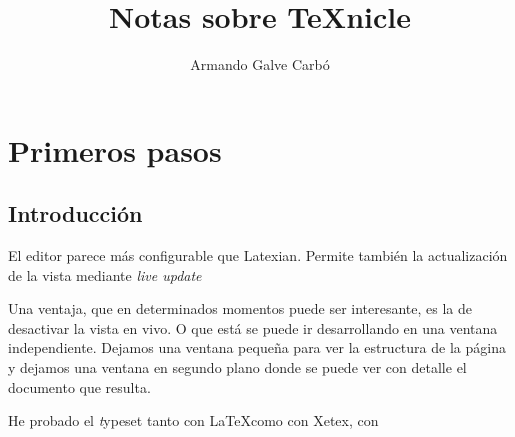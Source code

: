 \documentclass[11pt]{article}
\title{Notas sobre TeXnicle}
\author{Armando Galve Carbó}
\date{}
\begin{document}
\maketitle
\section{Primeros pasos}
\subsection{Introducción} El editor parece más configurable que Latexian. 
Permite también la actualización de la vista mediante \textit{live update}

Una ventaja, que en determinados momentos puede ser interesante, es la de 
desactivar la vista en vivo. O que está se puede ir desarrollando en una ventana 
independiente. Dejamos una ventana pequeña para ver la estructura de la página y 
dejamos una ventana en segundo plano donde se puede ver con detalle el documento 
que resulta.

He probado el {\textit typeset} tanto con \LaTeX como con Xetex, con 
\end{document}
